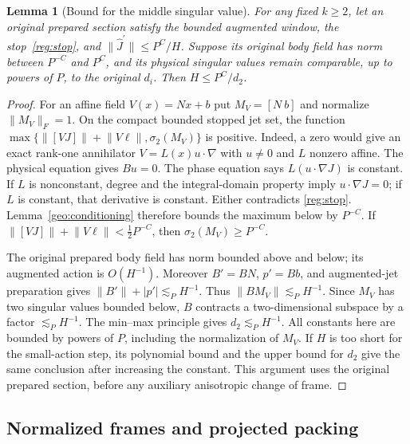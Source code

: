 \documentclass[11pt]{amsart}
\newtheorem{lemma}[theorem]{Lemma}
\theoremstyle{definition}
\theoremstyle{remark}
\newcommand{\norm}[1]{\lVert #1\rVert}
\newcommand{\abs}[1]{\lvert #1\rvert}
\numberwithin{equation}{section}
\begin{document}
\begin{lemma}[Bound for the middle singular value]\label{reg:middle-cutoff}
For any fixed $k\ge2$, let an original prepared section satisfy the bounded augmented window, the stop~\eqref{reg:stop}, and $\|\widehat J^{\prime}\|\le P^C/H$. Suppose its original body field has norm between $P^{-C}$ and $P^C$, and its physical singular values remain comparable, up to powers of $P$, to the original $d_i$. Then $H\le P^C/d_2$.
\end{lemma}
\begin{proof}
For an affine field $V(x)=Nx+b$ put $M_V=[N\ b]$ and normalize $\norm{M_V}_F=1$. On the compact bounded stopped jet set, the function $\max\{\norm{[VJ]}+\norm{V\ell},\sigma_2(M_V)\}$ is positive. Indeed, a zero would give an exact rank-one annihilator $V=L(x)u\cdot\nabla$ with $u\ne0$ and $L$ nonzero affine. The physical equation gives $Bu=0$. The phase equation says $L(u\cdot\nabla J)$ is constant. If $L$ is nonconstant, degree and the integral-domain property imply $u\cdot\nabla J=0$; if $L$ is constant, that derivative is constant. Either contradicts \eqref{reg:stop}. Lemma~\ref{geo:conditioning} therefore bounds the maximum below by $P^{-C}$. If $\norm{[VJ]}+\norm{V\ell}<\tfrac12P^{-C}$, then $\sigma_2(M_V)\ge P^{-C}$.

The original prepared body field has norm bounded above and below; its augmented action is $O(H^{-1})$. Moreover $B'=BN$, $p'=Bb$, and augmented-jet preparation gives $\norm{B'}+\abs{p'}\lesssim_P H^{-1}$. Thus $\norm{BM_V}\lesssim_P H^{-1}$. Since $M_V$ has two singular values bounded below, $B$ contracts a two-dimensional subspace by a factor $\lesssim_P H^{-1}$. The min--max principle gives $d_2\lesssim_P H^{-1}$. All constants here are bounded by powers of $P$, including the normalization of $M_V$. If $H$ is too short for the small-action step, its polynomial bound and the upper bound for $d_2$ give the same conclusion after increasing the constant. This argument uses the original prepared section, before any auxiliary anisotropic change of frame.
\end{proof}

\subsection{Normalized frames and projected packing}\label{atlas:normalized-frames}
\end{document}
